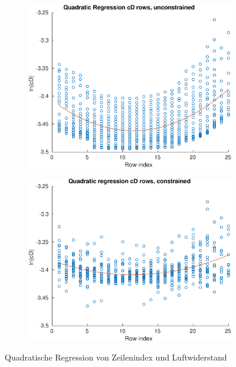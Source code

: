 \begin{figure}[h]
	\centering
	\begin{subfigure}[t]{0.5\textwidth}
		\centering
		\includegraphics[width=1\linewidth]{bilder/6pt1000Samples/cDRegressionRowUncon}
	\end{subfigure}\hfill
	\begin{subfigure}[t]{0.5\textwidth}
		\centering
		\includegraphics[width=1\linewidth]{bilder/6pt1000Samples/cDRegressionRowCon}
	\end{subfigure}
	\caption{Quadratische Regression von Zeilenindex und Luftwiderstand}
	\label{fig:regCDRow}
\end{figure}

